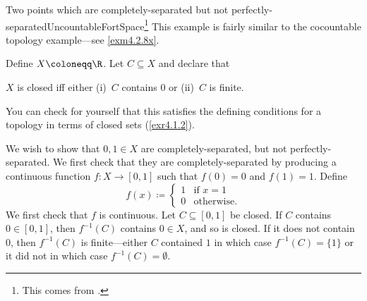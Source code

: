 \begin{exm}{Two points which are completely-separated but not perfectly-separated}{UncountableFortSpace}\footnote{This comes from \cite[pg.~52]{Steen}.}
This example is fairly similar to the cocountable topology example---see \cref{exm4.2.8x}.

Define $X\coloneqq \R$.  Let $C\subseteq X$ and declare that
\begin{textequation}
$X$ is closed iff either (i)~$C$ contains $0$ or (ii)~$C$ is finite.
\end{textequation}
You can check for yourself that this satisfies the defining conditions for a topology in terms of closed sets (\cref{exr4.1.2}).

We wish to show that $0,1\in X$ are completely-separated, but not perfectly-separated.  We first check that they are completely-separated by producing a continuous function $f\colon X\rightarrow [0,1]$ such that $f(0)=0$ and $f(1)=1$.  Define
\begin{equation}
f(x)\coloneqq \begin{cases}1 & \text{if }x=1 \\ 0 & \text{otherwise.}\end{cases}
\end{equation}
We first check that $f$ is continuous.  Let $C\subseteq [0,1]$ be closed.  If $C$ contains $0\in [0,1]$, then $f^{-1}(C)$ contains $0\in X$, and so is closed.  If it does not contain $0$, then $f^{-1}(C)$ is finite---either $C$ contained $1$ in which case $f^{-1}(C)=\{ 1\}$ or it did not in which case $f^{-1}(C)=\emptyset$.


\end{exm}
